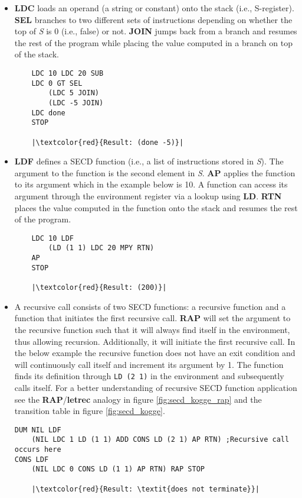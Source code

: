 \documentclass[a4paper,12pt,twoside,openright]{report}
\theoremstyle{definition}
\begin{document}
\begin{itemize}
    \item \textbf{LDC} loads an operand (a string or constant) onto the stack (i.e., S-register). \textbf{SEL} branches to two different sets of instructions depending on whether the top of \textit{S} is 0 (i.e., false) or not. \textbf{JOIN} jumps back from a branch and resumes the rest of the program while placing the value computed in a branch on top of the stack.
\begin{verbatim}
    LDC 10 LDC 20 SUB
    LDC 0 GT SEL
        (LDC 5 JOIN)
        (LDC -5 JOIN)
    LDC done
    STOP
    
    |\textcolor{red}{Result: (done -5)}|
\end{verbatim}
    \item \textbf{LDF} defines a SECD function (i.e., a list of instructions stored in \textit{S}). The argument to the function is the second element in \textit{S}. \textbf{AP} applies the function to its argument which in the example below is 10. A function can access its argument through the environment register via a lookup using \textbf{LD}. \textbf{RTN} places the value computed in the function onto the stack and resumes the rest of the program.
\begin{verbatim}
    LDC 10 LDF
        (LD (1 1) LDC 20 MPY RTN)
    AP
    STOP

    |\textcolor{red}{Result: (200)}|
\end{verbatim}

    \item A recursive call consists of two SECD functions: a recursive function and a function that initiates the first recursive call. \textbf{RAP} will set the argument to the recursive function such that it will always find itself in the environment, thus allowing recursion. Additionally, it will initiate the first recursive call. In the below example the recursive function does not have an exit condition and will continuously call itself and increment its argument by 1. The function finds its definition through \texttt{LD (2 1)} in the environment and subsequently calls itself. For a better understanding of recursive SECD function application see the \textbf{RAP}/\textbf{letrec} analogy in figure \ref{fig:secd_kogge_rap} and the transition table in figure \ref{fig:secd_kogge}.
\begin{verbatim}
DUM NIL LDF
    (NIL LDC 1 LD (1 1) ADD CONS LD (2 1) AP RTN) ;Recursive call occurs here
CONS LDF
    (NIL LDC 0 CONS LD (1 1) AP RTN) RAP STOP

    |\textcolor{red}{Result: \textit{does not terminate}}|
\end{verbatim}
\end{itemize}
\end{document}
